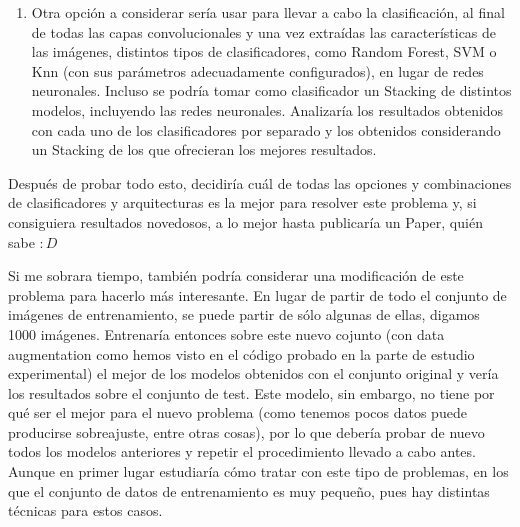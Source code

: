 \documentclass[a4paper,11pt]{article}
\begin{document}
\begin{enumerate}
	\item Otra opción a considerar sería usar para llevar a cabo la clasificación, al final de todas las capas convolucionales y una vez extraídas las características de las imágenes, distintos tipos de clasificadores, como Random Forest, SVM o Knn (con sus parámetros adecuadamente configurados), en lugar de redes neuronales. Incluso se podría tomar como clasificador un Stacking de distintos modelos, incluyendo las redes neuronales. Analizaría los resultados obtenidos con cada uno de los clasificadores por separado y los obtenidos considerando un Stacking de los que ofrecieran los mejores resultados. 
\end{enumerate}

Después de probar todo esto, decidiría cuál de todas las opciones y combinaciones de clasificadores y arquitecturas es la mejor para resolver este problema y, si consiguiera resultados novedosos, a lo mejor hasta publicaría un Paper, quién sabe $ :D $


Si me sobrara tiempo, también podría considerar una modificación de este problema para hacerlo más interesante. En lugar de partir de todo el conjunto de imágenes de entrenamiento, se puede partir de sólo algunas de ellas, digamos 1000 imágenes. Entrenaría entonces sobre este nuevo cojunto (con data augmentation como hemos visto en el código probado en la parte de estudio experimental) el mejor de los modelos obtenidos con el conjunto original y vería los resultados sobre el conjunto de test. Este modelo, sin embargo, no tiene por qué ser el mejor para el nuevo problema (como tenemos pocos datos puede producirse sobreajuste, entre otras cosas), por lo que debería probar de nuevo todos los modelos anteriores y repetir el procedimiento llevado a cabo antes. Aunque en primer lugar estudiaría cómo tratar con este tipo de problemas, en los que el conjunto de datos de entrenamiento es muy pequeño, pues hay distintas técnicas para estos casos. 
\end{document}
